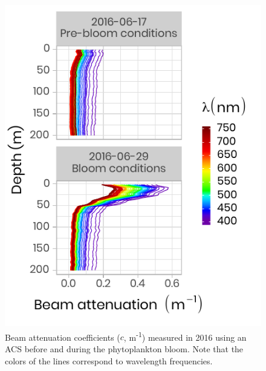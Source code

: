 \documentclass[12pt,a4paper]{scrartcl}
\begin{document}
\begin{figure}[h]
	\centering
	\includegraphics[scale = 2]{../../../graphs/fig6.pdf}
	\caption{Beam attenuation coefficients ($c$, m\textsuperscript{-1}) measured in 2016 using an ACS before and during the phytoplankton bloom. Note that the colors of the lines correspond to wavelength frequencies.}
\end{figure}

\clearpage
\newpage
\end{document}

